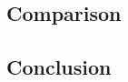 \documentclass[onecolumn, draftclsnofoot,10pt, compsoc]{IEEEtran}
\begin{document}
	\subsection{Comparison}
		

	\subsection{Conclusion}



\end{document}
